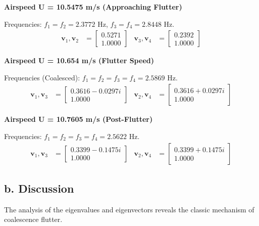 \documentclass{article}
\begin{document}
\noindent\textbf{Airspeed U = 10.5475 m/s (Approaching Flutter)}

\noindent Frequencies: $f_1 = f_2 = 2.3772$ Hz, $f_3 = f_4 = 2.8448$ Hz.
\begin{align*}
\mathbf{v}_1, \mathbf{v}_2 &= \begin{bmatrix} 0.5271 \\ 1.0000 \end{bmatrix} &
\mathbf{v}_3, \mathbf{v}_4 &= \begin{bmatrix} 0.2392 \\ 1.0000 \end{bmatrix}
\end{align*}

\noindent\textbf{Airspeed U = 10.654 m/s (Flutter Speed)}

\noindent Frequencies (Coalesced): $f_1 = f_2 = f_3 = f_4 = 2.5869$ Hz.
\begin{align*}
\mathbf{v}_1, \mathbf{v}_3 &= \begin{bmatrix} 0.3616 - 0.0297i \\ 1.0000 \end{bmatrix} &
\mathbf{v}_2, \mathbf{v}_4 &= \begin{bmatrix} 0.3616 + 0.0297i \\ 1.0000 \end{bmatrix}
\end{align*}

\noindent\textbf{Airspeed U = 10.7605 m/s (Post-Flutter)}

\noindent Frequencies: $f_1 = f_2 = f_3 = f_4 = 2.5622$ Hz.
\begin{align*}
\mathbf{v}_1, \mathbf{v}_3 &= \begin{bmatrix} 0.3399 - 0.1475i \\ 1.0000 \end{bmatrix} &
\mathbf{v}_2, \mathbf{v}_4 &= \begin{bmatrix} 0.3399 + 0.1475i \\ 1.0000 \end{bmatrix}
\end{align*}


\subsection{b. Discussion}
The analysis of the eigenvalues and eigenvectors reveals the classic mechanism of coalescence flutter.
\end{document}
